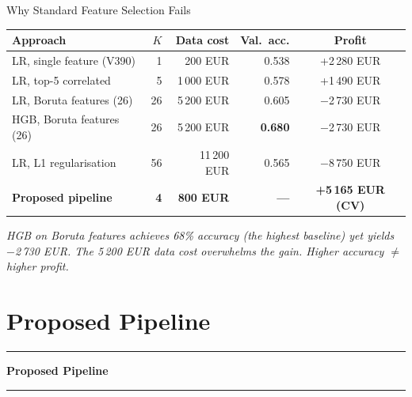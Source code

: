 \documentclass[aspectratio=169,10pt]{beamer}
\newcommand{\sectionslide}[1]{%
  \begin{frame}[plain]
    \centering\vfill
    \textcolor{mid}{\rule{0.10\textwidth}{0.3pt}}\par\vspace{0.5em}
    {\large\bfseries #1}\par\vspace{0.5em}
    \textcolor{mid}{\rule{0.10\textwidth}{0.3pt}}
    \vfill
  \end{frame}%
}
\begin{document}
\begin{frame}{Why Standard Feature Selection Fails}
\begin{center}
\footnotesize
\begin{tabular}{@{}lrrrc@{}}
\toprule
Approach & $K$ & Data cost & Val.\ acc. & Profit \\
\midrule
LR, single feature (V390)    & 1  & 200 EUR    & 0.538 & +2\,280 EUR \\
LR, top-5 correlated         & 5  & 1\,000 EUR & 0.578 & +1\,490 EUR \\
LR, Boruta features (26)     & 26 & 5\,200 EUR & 0.605 & $-$2\,730 EUR \\
HGB, Boruta features (26)    & 26 & 5\,200 EUR & \textbf{0.680} & $-$2\,730 EUR \\
LR, L1 regularisation        & 56 & 11\,200 EUR & 0.565 & $-$8\,750 EUR \\
\midrule
\textbf{Proposed pipeline}      & \textbf{4} & \textbf{800 EUR} & \textbf{---} & \textbf{+5\,165 EUR (CV)} \\
\bottomrule
\end{tabular}
\end{center}

\vspace{0.3em}
{\footnotesize\itshape HGB on Boruta features achieves 68\% accuracy (the highest baseline) yet yields $-$2\,730 EUR. The 5\,200 EUR data cost overwhelms the gain. Higher accuracy $\neq$ higher profit.}
\end{frame}

\section{Proposed Pipeline}
\sectionslide{Proposed Pipeline}
\end{document}

